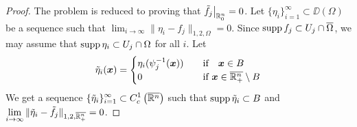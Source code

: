 \begin{proof}
The problem is reduced to proving that
$\displaystyle \tilde{f}_j \big|_{\mathbb{R}^n_0} = 0$.
Let $\displaystyle \{ \eta_i \}_{i=1}^\infty \subset \DD(\Omega)$
be a sequence such that
$\displaystyle \lim_{i\rightarrow \infty} \|\eta_i -f_j \|_{1,2,\Omega} = 0$.
Since $\displaystyle \operatorname{supp} f_j \subset U_j \cap \overline{\Omega}$, we
may assume that $\operatorname{supp} \eta_i \subset U_j \cap \Omega$ for all $i$.
Let
\[
\tilde{\eta}_i({\bm{x}}) =
\begin{cases}
\eta_i(\psi_j^{-1}({\bm{x}})) & \quad \text{if} \quad {\bm{x}} \in B \\
0 & \quad \text{if} \ {\bm{x}} \in \overline{\mathbb{R}^n_+} \setminus B
\end{cases}
\]
We get a sequence
$\displaystyle \{ \tilde{\eta}_i \}_{i=1}^\infty \subset
C^1_c\left(\overline{\mathbb{R}^n}\right)$
such that $\operatorname{supp} \tilde{\eta}_i \subset B$ and
$\displaystyle \lim_{i\rightarrow \infty}
\|\tilde{\eta}_i -\tilde{f}_j \|_{1,2,\overline{\mathbb{R}^n_+}} = 0$.


\end{proof}
